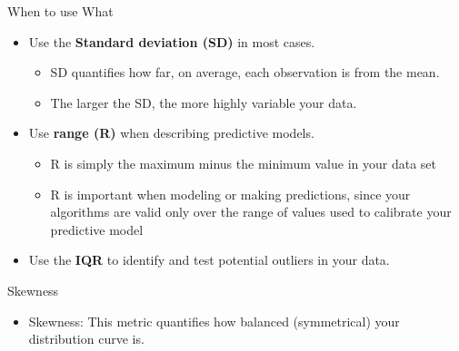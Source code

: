 \documentclass[
  ignorenonframetext,
]{beamer}
\providecommand{\tightlist}{%
  \setlength{\itemsep}{0pt}\setlength{\parskip}{0pt}}
\begin{document}
\begin{frame}{When to use What}
\label{when-to-use-what-1}
\begin{itemize}
\tightlist
\item
  Use the \textbf{Standard deviation (SD)} in most cases.

  \begin{itemize}
  \tightlist
  \item
    SD quantifies how far, on average, each observation is from the
    mean.
  \item
    The larger the SD, the more highly variable your data.
  \end{itemize}
\end{itemize}

\begin{itemize}
\tightlist
\item
  Use \textbf{range (R)} when describing predictive models.

  \begin{itemize}
  \tightlist
  \item
    R is simply the maximum minus the minimum value in your data set
  \item
    R is important when modeling or making predictions, since your
    algorithms are valid only over the range of values used to calibrate
    your predictive model
  \end{itemize}
\end{itemize}

\begin{itemize}
\tightlist
\item
  Use the \textbf{IQR} to identify and test potential outliers in your
  data.
\end{itemize}
\end{frame}

\begin{frame}{Skewness}
\label{skewness}
\begin{itemize}
\tightlist
\item
  Skewness: This metric quantifies how balanced (symmetrical) your
  distribution curve is.
\end{itemize}
\end{frame}
\end{document}
